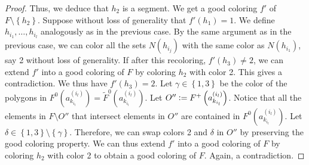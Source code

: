\documentclass[12pt]{article}
\theoremstyle{definition}
\newcommand{\defeq}{\vcentcolon=}
\begin{document}
\begin{proof}
         Thus, we deduce that $h_2$ is a segment.
         We get a good coloring $f'$ of
         $F \setminus \left\{h_2\right\}$.
         Suppose without loss of generality
         that $f'\left(h_1\right) = 1$.
         We define $h_{i_1}, \ldots, h_{i_{l}}$ 
         analogously as in the previous case.
         By the same argument as in the previous case,
         we can color all the sets 
         $N\left(h_{i_{j}}\right)$ with the
         same color as $N\left(h_{i_1}\right)$,
         say 2 without loss of generality.
         If after this recoloring,
         $f'\left(h_3\right) \neq 2$, 
         we can extend $f'$ into a
         good coloring of $F$ by 
         coloring $h_2$ with color 2.
         This gives a contradiction.
         We thus have $f'\left(h_3\right) = 2$.
         Let $\gamma \in \left\{1, 3\right\}$
         be the color of the polygons
         in $F^{0}\left(a_{k_{i_{l}}}^{\left(i_{l}\right)}\right)
         = \widetilde{F}^{0}\left(
         a_{k_{i_{l}}}^{\left(i_{l}\right)}\right)$.
         Let $O'' \defeq F^{+}\left(
         a_{k_{i_{l}}}^{\left(i_{l}\right)}\right)$.
         Notice that all the elements
         in $F \setminus O''$ 
         that intersect elements in $O''$
         are contained in $F^{0}\left(
         a_{k_{i_{l}}}^{\left(i_{l}\right)}\right)$.
         Let $\delta \in \left\{1, 3\right\}
         \setminus \left\{\gamma\right\}$.
         Therefore, we can swap colors
         2 and $\delta$ in $O''$
         by preserving the good coloring property.
         We can thus extend $f'$ into a
         good coloring of $F$ by
         coloring $h_2$ with color 2
         to obtain a good coloring of $F$.
         Again, a contradiction.
     \end{proof}
\end{document}
